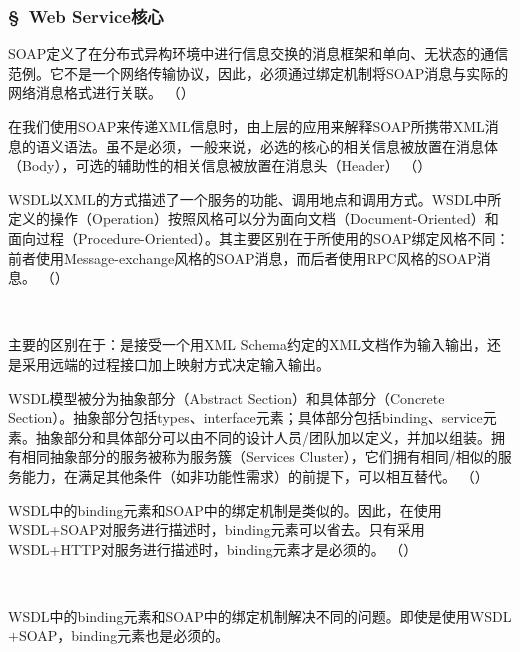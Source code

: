 \subsubsection*{\S\ Web Service核心}
\setcounter{problemname}{0}

\begin{problem}
	SOAP定义了在分布式异构环境中进行信息交换的消息框架和单向、无状态的通信范例。它不是一个网络传输协议，因此，必须通过绑定机制将SOAP消息与实际的网络消息格式进行关联。
	\hfill （）
\end{problem}


\begin{problem}
	在我们使用SOAP来传递XML信息时，由上层的应用来解释SOAP所携带XML消息的语义语法。虽不是必须，一般来说，必选的核心的相关信息被放置在消息体（Body），可选的辅助性的相关信息被放置在消息头（Header）
	\hfill （）
\end{problem}


\begin{problem}
	WSDL以XML的方式描述了一个服务的功能、调用地点和调用方式。WSDL中所定义的操作（Operation）按照风格可以分为面向文档（Document-Oriented）和面向过程（Procedure-Oriented）。其主要区别在于所使用的SOAP绑定风格不同：前者使用Message-exchange风格的SOAP消息，而后者使用RPC风格的SOAP消息。
	\hfill （）
\end{problem}
\\ \begin{solution}
	主要的区别在于：是接受一个用XML Schema约定的XML文档作为输入输出，还是采用远端的过程接口加上映射方式决定输入输出。
\end{solution}


\begin{problem}
	WSDL模型被分为抽象部分（Abstract Section）和具体部分（Concrete Section）。抽象部分包括types、interface元素；具体部分包括binding、service元素。抽象部分和具体部分可以由不同的设计人员/团队加以定义，并加以组装。拥有相同抽象部分的服务被称为服务簇（Services Cluster），它们拥有相同/相似的服务能力，在满足其他条件（如非功能性需求）的前提下，可以相互替代。
	\hfill （）
\end{problem}


\begin{problem}
	WSDL中的binding元素和SOAP中的绑定机制是类似的。因此，在使用WSDL+SOAP对服务进行描述时，binding元素可以省去。只有采用WSDL+HTTP对服务进行描述时，binding元素才是必须的。
	\hfill （）
\end{problem}
\\ \begin{solution}
	WSDL中的binding元素和SOAP中的绑定机制解决不同的问题。即使是使用WSDL$+$SOAP，binding元素也是必须的。
\end{solution}

